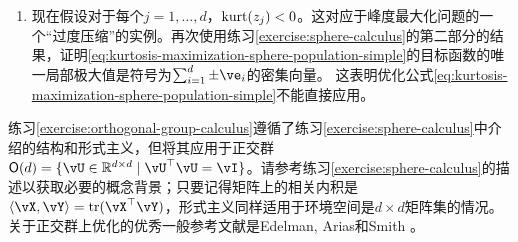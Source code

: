 \documentclass[../../book-main_zh.tex]{subfiles}
\begin{document}
\begin{exercise}
\begin{enumerate}
        \item 现在假设对于每个$j =1, \dots, d$，$\mathop{\mathrm{kurt}}(z_j) < 0$。这对应于峰度最大化问题的一个“过度压缩”的实例。再次使用练习\ref{exercise:sphere-calculus}的第二部分的结果，证明\eqref{eq:kurtosis-maximization-sphere-population-simple}的目标函数的唯一局部极大值是符号为$\sum_{i=1}^d \pm \ve_i$的密集向量。
        这表明优化公式\eqref{eq:kurtosis-maximization-sphere-population-simple}不能直接应用。
    \end{enumerate}
\end{exercise}

\begin{exercise}\label{exercise:fast-ica-convergence}
\end{exercise}


练习\ref{exercise:orthogonal-group-calculus}遵循了练习\ref{exercise:sphere-calculus}中介绍的结构和形式主义，但将其应用于正交群$\O(d) = \set{\vU \in \R^{d \times d} \given \vU^\top \vU = \vI}$。请参考练习\ref{exercise:sphere-calculus}的描述以获取必要的概念背景；只要记得矩阵上的相关内积是$\ip{\vX}{\vY} = \tr(\vX^\top \vY)$，形式主义同样适用于环境空间是$d \times d$矩阵集的情况。关于正交群上优化的优秀一般参考文献是Edelman, Arias和Smith \cite{Edelman1998-lg}。
\end{document}

